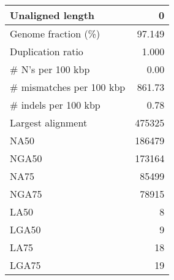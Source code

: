 \documentclass[12pt,a4paper]{article}
\begin{document}
\begin{table}[ht]
\begin{center}
\begin{tabular}{|l*{1}{|r}|}
Unaligned length & 0 \\ \hline
Genome fraction (\%) & 97.149 \\ \hline
Duplication ratio & 1.000 \\ \hline
\# N's per 100 kbp & 0.00 \\ \hline
\# mismatches per 100 kbp & 861.73 \\ \hline
\# indels per 100 kbp & 0.78 \\ \hline
Largest alignment & 475325 \\ \hline
NA50 & 186479 \\ \hline
NGA50 & 173164 \\ \hline
NA75 & 85499 \\ \hline
NGA75 & 78915 \\ \hline
LA50 & 8 \\ \hline
LGA50 & 9 \\ \hline
LA75 & 18 \\ \hline
LGA75 & 19 \\ \hline
\end{tabular}
\end{center}
\end{table}
\end{document}
